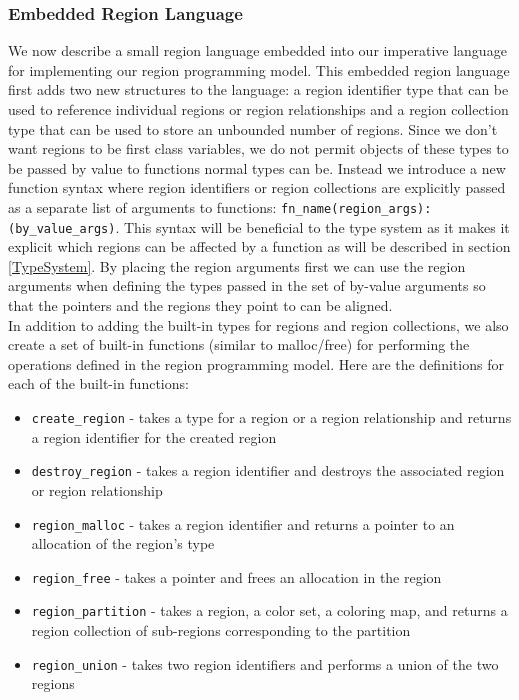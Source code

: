 \documentclass{article}
\theoremstyle{definition}
\begin{document}
\subsubsection{Embedded Region Language \label{Embedded}}
\noindent
We now describe a small region language embedded into our imperative language for implementing
our region programming model.  This embedded region language first adds two new structures
to the language: a region identifier type that can be used to reference individual regions
or region relationships and a region collection type that can be used to store an unbounded
number of regions.  Since we don't want regions to be first class variables, we do not permit
objects of these types to be passed by value to functions normal types can be.  Instead we
introduce a new function syntax where region identifiers or region collections are explicitly
passed as a separate list of arguments to functions: {\tt fn\_name(region\_args):(by\_value\_args)}.
This syntax will be beneficial to the type system as it makes it explicit which regions can
be affected by a function as will be described in section \ref{TypeSystem}.  By placing the
region arguments first we can use the region arguments when defining the types passed in the
set of by-value arguments so that the pointers and the regions they point to can be aligned.\\

\noindent
In addition to adding the built-in types for regions and region collections, we also create
a set of built-in functions (similar to malloc/free) for performing the operations defined
in the region programming model.  Here are the definitions for each of the built-in functions:

\begin{itemize}
\item {\tt create\_region} - takes a type for a region or a region relationship and returns a
region identifier for the created region 
\item {\tt destroy\_region} - takes a region identifier and destroys the associated region or region relationship
\item {\tt region\_malloc} - takes a region identifier and returns a pointer to an allocation of the region's type
\item {\tt region\_free} - takes a pointer and frees an allocation in the region
\item {\tt region\_partition} - takes a region, a color set, a coloring map, and returns a region collection
of sub-regions corresponding to the partition
\item {\tt region\_union} - takes two region identifiers and performs a union of the two regions
\end{itemize}
\end{document}
